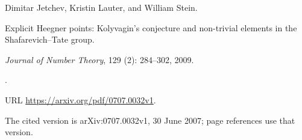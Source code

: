 Dimitar Jetchev, Kristin Lauter, and William Stein.

\newblock Explicit {H}eegner points: {K}olyvagin's conjecture and non-trivial
  elements in the {S}hafarevich--{T}ate group.

\newblock \emph{Journal of Number Theory}, 129 (2): 284--302, 2009.

\newblock {}.

\newblock URL \url{https://arxiv.org/pdf/0707.0032v1}.

\newblock The cited version is arXiv:0707.0032v1, 30 June 2007; page references use that version.
